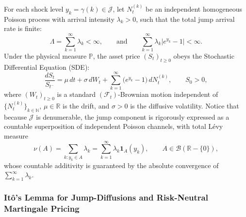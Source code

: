\documentclass[11pt, letterpaper]{article}
\theoremstyle{definition}
\theoremstyle{remark}
\begin{document}
For each shock level $y_k = \gamma(k) \in \mathcal{J}$, let $N_t^{(k)}$ be an independent homogeneous Poisson process with arrival intensity $\lambda_k > 0$, such that the total jump arrival rate is finite:
\[
\Lambda = \sum_{k=1}^{\infty} \lambda_k < \infty, \qquad \text{and} \qquad \sum_{k=1}^{\infty} \lambda_k \bigl|e^{y_k} - 1\bigr| < \infty.
\]
Under the physical measure $\mathbb{P}$, the asset price $(S_t)_{t \ge 0}$ obeys the Stochastic Differential Equation (SDE):
\[
\frac{dS_t}{S_{t^-}} = \mu\, dt + \sigma\, dW_t + \sum_{k=1}^{\infty} \bigl(e^{y_k} - 1\bigr)\, dN_t^{(k)}, \qquad S_0 > 0,
\]
where $(W_t)_{t \ge 0}$ is a standard $(\mathcal{F}_t)$-Brownian motion independent of $\{N_t^{(k)}\}_{k \in \mathbb{N}}$, $\mu \in \mathbb{R}$ is the drift, and $\sigma > 0$ is the diffusive volatility. Notice that because $\mathcal{J}$ is denumerable, the jump component is rigorously expressed as a countable superposition of independent Poisson channels, with total L\'evy measure
\[
\nu(A) = \sum_{k : y_k \in A} \lambda_k = \sum_{k=1}^{\infty} \lambda_k \mathbf{1}_{A}(y_k), \qquad A \in \mathcal{B}(\mathbb{R} - \{0\}),
\]
whose countable additivity is guaranteed by the absolute convergence of $\sum_{k=1}^{\infty} \lambda_k$.

\subsubsection{It\^o's Lemma for Jump-Diffusions and Risk-Neutral Martingale Pricing}
\end{document}
